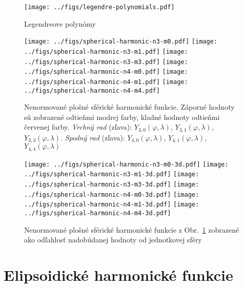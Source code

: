 \documentclass[a4paper, 12pt]{book}
\begin{document}


\begin{figure}[bt]
\centering
\texttt{[image: ../figs/legendre-polynomials.pdf]}
\caption{Legendreove polynómy}
\end{figure}




\begin{figure}[bt]
\centering
\texttt{[image: ../figs/spherical-harmonic-n3-m0.pdf]}
\texttt{[image: ../figs/spherical-harmonic-n3-m1.pdf]}
\texttt{[image: ../figs/spherical-harmonic-n3-m3.pdf]}
\texttt{[image: ../figs/spherical-harmonic-n4-m0.pdf]}
\texttt{[image: ../figs/spherical-harmonic-n4-m1.pdf]}
\texttt{[image: ../figs/spherical-harmonic-n4-m4.pdf]}
\caption{Nenormované plošné sférické harmonické funkcie.  Záporné hodnoty sú 
zobrazené odtieňmi modrej farby, kladné hodnoty odtieňmi červenej farby.  
\textit{Vrchný rad} (zľava): $Y_{3,0}(\varphi, \lambda)$, $Y_{3,1}(\varphi, 
\lambda)$, $Y_{3,3}(\varphi, \lambda)$.  \textit{Spodný rad} (zľava): 
$Y_{4,0}(\varphi, \lambda)$, $Y_{4,1}(\varphi, \lambda)$, $Y_{4,4}(\varphi, 
\lambda)$}
\label{fig:sh}
\end{figure}


\begin{figure}[bt]
\centering
\texttt{[image: ../figs/spherical-harmonic-n3-m0-3d.pdf]}
\texttt{[image: ../figs/spherical-harmonic-n3-m1-3d.pdf]}
\texttt{[image: ../figs/spherical-harmonic-n3-m3-3d.pdf]}
\texttt{[image: ../figs/spherical-harmonic-n4-m0-3d.pdf]}
\texttt{[image: ../figs/spherical-harmonic-n4-m1-3d.pdf]}
\texttt{[image: ../figs/spherical-harmonic-n4-m4-3d.pdf]}
\caption{Nenormované plošné sférické harmonické funkcie z Obr.~\ref{fig:sh} 
zobrazené ako odľahlosť nadobúdanej hodnoty od jednotkovej sféry}
\label{fig:sh3d}
\end{figure}






\section{Elipsoidické harmonické funkcie}
\end{document}
